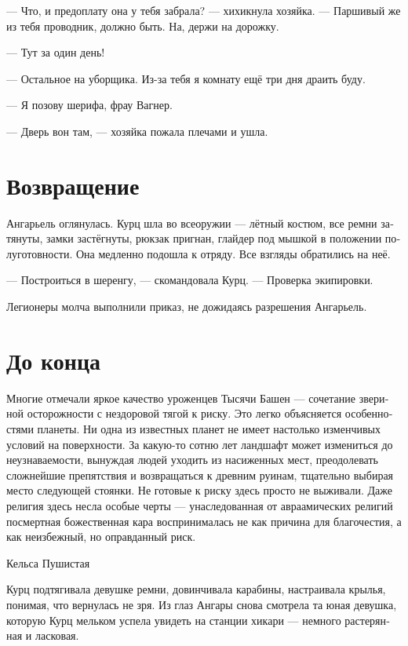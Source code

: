 \documentclass[a4paper,12pt,fleqn]{book}\usepackage{polyglossia}\setdefaultlanguage[babelshorthands=true]{russian}\setotherlanguage{english}\defaultfontfeatures{Ligatures=TeX,Mapping=tex-text}\usepackage{xcolor}\newcommand{\ml}[3]{#2}
\begin{document}
--- Что, и предоплату она у тебя забрала? --- хихикнула хозяйка.
\ml{$0$}
{--- Паршивый же из тебя проводник, должно быть.}
{``You must be shit of a guide.}
\ml{$0$}
{На, держи на дорожку.}
{Here, take a little for the road.''}

\ml{$0$}
{--- Тут за один день!}
{``It's one day rent!''}

\ml{$0$}
{--- Остальное на уборщика.}
{``The rest is for a cleaner.}
\ml{$0$}
{Из-за тебя я комнату ещё три дня драить буду.}
{I'll have to scrub that room for three days because of you.''}

\ml{$0$}
{--- Я позову шерифа, фрау Вагнер.}
{``I call the Scherif, frau Wagner.''}

\ml{$0$}
{--- Дверь вон там, --- хозяйка пожала плечами и ушла.}
{``There's the door.'' The host shrugged and left.}

\section{Возвращение}

Ангарьель оглянулась.
Курц шла во всеоружии --- лётный костюм, все ремни затянуты, замки застёгнуты, рюкзак пригнан, глайдер под мышкой в положении полуготовности.
Она медленно подошла к отряду.
Все взгляды обратились на неё.

--- Построиться в шеренгу, --- скомандовала Курц.
--- Проверка экипировки.

Легионеры молча выполнили приказ, не дожидаясь разрешения Ангарьель.

\section{До конца}

\epigraph{Многие отмечали яркое качество уроженцев Тысячи Башен --- сочетание звериной осторожности с нездоровой тягой к риску.
Это легко объясняется особенностями планеты.
Ни одна из известных планет не имеет настолько изменчивых условий на поверхности.
За какую-то сотню лет ландшафт может измениться до неузнаваемости, вынуждая людей уходить из насиженных мест, преодолевать сложнейшие препятствия и возвращаться к древним руинам, тщательно выбирая место следующей стоянки.
Не готовые к риску здесь просто не выживали.
Даже религия здесь несла особые черты --- унаследованная от авраамических религий посмертная божественная кара воспринималась не как причина для благочестия, а как неизбежный, но оправданный риск.
}{Кельса Пушистая}

Курц подтягивала девушке ремни, довинчивала карабины, настраивала крылья, понимая, что вернулась не зря.
Из глаз Ангары снова смотрела та юная девушка, которую Курц мельком успела увидеть на станции хикари --- немного растерянная и ласковая.
\end{document}
